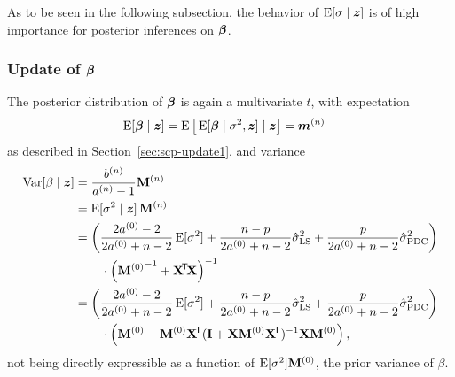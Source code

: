 As to be seen in the following subsection, the behavior of $\operatorname{E}[\sigma\mid {\bm z}]$ is of high
importance for posterior inferences on $\boldsymbol{\beta}$.


\subsubsection{Update of \texorpdfstring{$\boldsymbol{\beta}$}{beta}}
\label{sec:scp-update3}

The posterior distribution of $\boldsymbol{\beta}$ is again a multivariate $t$, with expectation
\begin{align*}
\operatorname{E}[\boldsymbol{\beta}\mid {\bm z}] &= \operatorname{E}\big[ \operatorname{E}[\boldsymbol{\beta}\mid\sigma^2, {\bm z}] \mid {\bm z} \big]= {\bm m}^{(n)}
\end{align*}
as described in Section~\ref{sec:scp-update1},
and variance %
\begin{align}
\V[\beta\mid \z]
                  &= \frac{\bn}{\an - 1} \Mn \nonumber\\
                  &= \E[\sigma^2\mid \z]\, \Mn  \label{equ:scp-varbeta}\\
                  &= \bigg( \frac{2\az - 2}{2\az + n - 2} \E[\sigma^2]
                           +\frac{n - p}   {2\az + n - 2} \sls
                           +\frac{p}       {2\az + n - 2} \spdc \bigg) \nonumber\\
                  & \hspace*{5ex}\cdot
                     \left( {\Mz}^{-1} + \XtX \right)^{-1} \nonumber\\
                  &= \bigg( \frac{2\az - 2}{2\az + n - 2} \E[\sigma^2]
                           +\frac{n - p}   {2\az + n - 2} \sls
                           +\frac{p}       {2\az + n - 2} \spdc \bigg) \nonumber\\
                  & \hspace*{5ex}\cdot
                     \Big( \Mz - \Mz \X^\tra (\mbf{I} + \X \Mz \X^\tra)^{-1} \X \Mz \Big) \,, \nonumber%
\end{align}
not being directly expressible as a function of $\operatorname{E}[\sigma^2] \mathbf{M}^{(0)}$,
the prior variance of $\beta$. %

